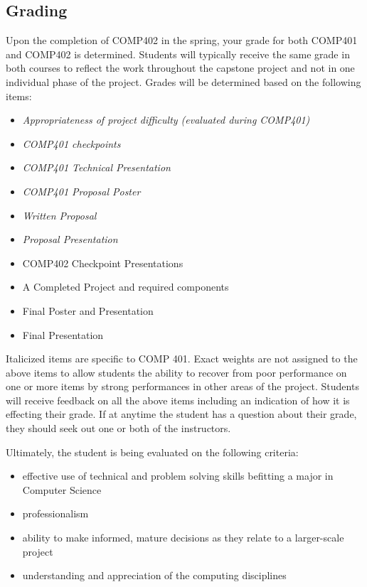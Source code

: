 \documentclass[10pt]{article}
\begin{document}
\subsection{Grading}

Upon the completion of COMP402 in the spring, your grade for both COMP401 and COMP402 is determined. Students will typically receive the same grade in both courses to reflect the work throughout the capstone project and not in one individual phase of the project. Grades will be determined based on the following items:
\begin{itemize}
\item \textit{Appropriateness of project difficulty (evaluated during COMP401) }
\item \textit{COMP401 checkpoints}
\item \textit{COMP401 Technical Presentation}
\item \textit{COMP401 Proposal Poster}
\item \textit{Written Proposal}
\item \textit{Proposal Presentation}
\item COMP402 Checkpoint Presentations 
\item A Completed Project and required components
\item Final Poster and Presentation
\item Final Presentation 
\end{itemize}
Italicized items are specific to COMP 401. Exact weights are not assigned to the above items to allow students the ability to recover from poor performance on one or more items by strong performances in other areas of the project.  Students will receive feedback on all the above items including an indication of how it is effecting their grade.  If at anytime the student has a question about their grade, they should seek out one or both of the instructors. 

Ultimately, the student is being evaluated on the following criteria:
\begin{itemize}
\item effective use of technical and problem solving skills befitting a major in Computer Science
\item professionalism
\item ability to make informed, mature decisions as they relate to a larger-scale project
\item understanding and appreciation of the computing disciplines
\end{itemize}
\end{document}
